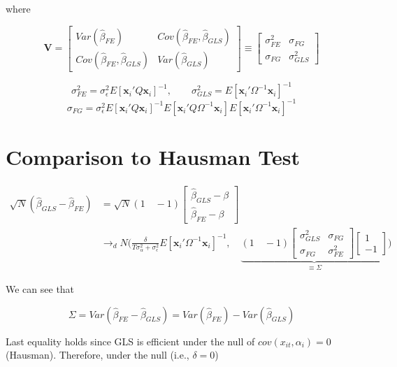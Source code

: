 \documentclass[11pt]{article}
\begin{document}
where 

\[
\mathbf{V} = \begin{bmatrix}
Var(\widehat{\beta}_{FE}) & Cov(\widehat{\beta}_{FE}, \widehat{\beta}_{GLS})\\
Cov(\widehat{\beta}_{FE}, \widehat{\beta}_{GLS}) &Var(\widehat{\beta}_{GLS})
\end{bmatrix} \equiv
\begin{bmatrix}
\sigma_{FE}^2 & \sigma_{FG}\\
\sigma_{FG} &\sigma_{GLS}^2
\end{bmatrix} 
\]

\[
\sigma_{FE}^2 = \sigma_\epsilon^2 E[\mathbf{x}_i' Q \mathbf{x}_i]^{-1}, \qquad \sigma_{GLS}^2 = E[\mathbf{x}_i' \Omega^{-1} \mathbf{x}_i]^{-1}
\]
\[
\sigma_{FG} = \sigma_{\epsilon}^2 E[\mathbf{x}_i' Q \mathbf{x}_i]^{-1} E[\mathbf{x}_i' Q\Omega^{-1} \mathbf{x}_i] E[\mathbf{x}_i' \Omega^{-1} \mathbf{x}_i]^{-1}
\]

\section*{Comparison to Hausman Test}

\begin{align*}
\sqrt{N} (\widehat{\beta}_{GLS} - \widehat{\beta}_{FE}) & = \sqrt{N} (1 \quad -1)  \begin{bmatrix}
\widehat{\beta}_{GLS}-\beta\\
\widehat{\beta}_{FE}-\beta
\end{bmatrix} \\
& \rightarrow_d N \bigg(\frac{\delta}{T\sigma_\alpha^2 + \sigma_\epsilon^2}E[\mathbf{x}_i' \Omega^{-1} \mathbf{x}_i]^{-1}, \quad \underbrace{(1\quad -1) \begin{bmatrix}
\sigma_{GLS}^2 & \sigma_{FG}\\
\sigma_{FG} &\sigma_{FE}^2
\end{bmatrix}  \begin{bmatrix}
1\\
-1
\end{bmatrix}}_{\equiv \Sigma} \bigg )
\end{align*}

We can see that 

\[
\Sigma = Var(\widehat{\beta}_{FE} - \widehat{\beta}_{GLS}) = Var(\widehat{\beta}_{FE}) - Var(\widehat{\beta}_{GLS})
\]

Last equality holds since GLS is efficient under the null of $cov(x_{it}, \alpha_i)=0$ (Hausman). Therefore, under the null (i.e., $\delta=0$)
\end{document}
